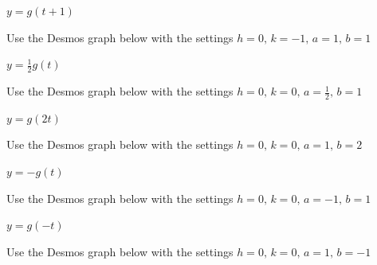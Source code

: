 \documentclass{ximera}
\begin{document}
\begin{question}
\begin{problem}
$y = g(t + 1)$

\begin{solution}
Use the Desmos graph below with the settings $h=0,\,k=-1,\,a=1,\,b=1$

\begin{center} 
\end{center}
\end{solution} 
\end{problem}

\begin{problem}
$y = \frac{1}{2} g(t)$

\begin{solution}
Use the Desmos graph below with the settings $h=0,\,k=0,\,a=\frac{1}{2},\,b=1$

\begin{center} 
\end{center}
\end{solution} 
\end{problem}


\begin{problem}
$y = g(2t)$

\begin{solution}
Use the Desmos graph below with the settings $h=0,\,k=0,\,a=1,\,b=2$

\begin{center} 
\end{center}
\end{solution} 
\end{problem}

\begin{problem}
$y = - g(t)$

\begin{solution}
Use the Desmos graph below with the settings $h=0,\,k=0,\,a=-1,\,b=1$

\begin{center} 
\end{center}
\end{solution} 
\end{problem}

\begin{problem}
$y = g(-t)$

\begin{solution}
Use the Desmos graph below with the settings $h=0,\,k=0,\,a=1,\,b=-1$

\begin{center} 
\end{center}
\end{solution} 
\end{problem}


\end{question}
\end{document}
